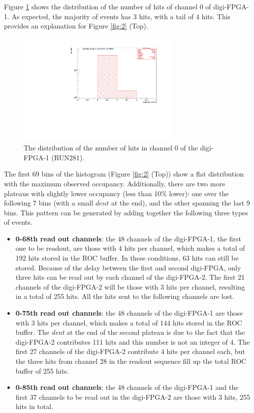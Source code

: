 Figure \ref{fig:66} shows the distribution of the number of 
hits of channel 0 of digi-FPGA-1. As expected, 
the majority of events 
has 3 hits, with a tail of 4 hits. 
This provides an explanation for Figure \ref{fig:2} (Top).
\begin{figure}[!h]
\centering
\includegraphics[width =0.7\textwidth]{figures/pdf/figure_00066_nhits_ch00_run281.pdf}
\caption[The distribution of the number of hits in channel 0.]{
  The distribution of the number of hits in channel 
  0 of the digi-FPGA-1 (RUN281).
}
\label{fig:66}
\end{figure}
The first 69 bins of the histogram (Figure \ref{fig:2} (Top)) 
show a flat distribution with the maximum observed occupancy. 
Additionally, there are two more plateaus with slightly lower 
occupancy (less than 10\% lower): one over the following 
7 bins (with a small $dent$ at the end), and the other 
spanning the last 9 bins.
This pattern can be generated by adding together the 
following three types of events.
\begin{itemize}
  \item \textbf{0-68th read out channels}: 
  the 48 channels of the digi-FPGA-1, the first one to be readout, 
  are those with 4 hits per channel, 
  which makes a total of 192 hits stored in the ROC buffer. 
  In these conditions, 63 hits can still be stored.
  Because of the delay between the first and second digi-FPGA, 
  only three hits can be read out by each channel 
  of the digi-FPGA-2. The first 21 channels of the 
  digi-FPGA-2 will be those with 3 hits per channel, resulting in a 
  total of 255 hits. All the hits sent to the following 
  channels are lost.
  \item \textbf{0-75th read out channels}: 
  the 48 channels of the digi-FPGA-1 are 
  those with 3 hits per channel, 
  which makes a total of 144 hits stored in the ROC buffer.
  The \textit{dent} at the end of the second 
  plateau is due to the 
  fact that the digi-FPGA-2 contributes 111 hits and this number 
  is not an integer of 4. 
  The first 27 channels of the digi-FPGA-2 contribute
  4 hits per channel each, but 
  the three hits from channel 28 in the 
  readout sequence
  fill up the total ROC buffer of 255 hits. 
  \item \textbf{0-85th read out channels}: 
  the 48 channels of the digi-FPGA-1 and the 
  first 37 channels to be read out in the digi-FPGA-2 
  are those with 3 hits, 255 hits in total.

\end{itemize}
